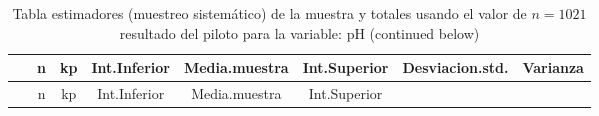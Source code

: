 \documentclass[
]{article}
\begin{document}
\begin{longtable}[]{@{}cccccccc@{}}
\caption{Tabla estimadores (muestreo sistemático) de la muestra y
totales usando el valor de \(n = 1021\) resultado del piloto para la
variable: pH (continued below)}\tabularnewline
\toprule
\begin{minipage}[b]{0.18\columnwidth}\centering
~\strut
\end{minipage} & \begin{minipage}[b]{0.05\columnwidth}\centering
n\strut
\end{minipage} & \begin{minipage}[b]{0.03\columnwidth}\centering
kp\strut
\end{minipage} & \begin{minipage}[b]{0.10\columnwidth}\centering
Int.Inferior\strut
\end{minipage} & \begin{minipage}[b]{0.11\columnwidth}\centering
Media.muestra\strut
\end{minipage} & \begin{minipage}[b]{0.10\columnwidth}\centering
Int.Superior\strut
\end{minipage} & \begin{minipage}[b]{0.12\columnwidth}\centering
Desviacion.std.\strut
\end{minipage} & \begin{minipage}[b]{0.08\columnwidth}\centering
Varianza\strut
\end{minipage}\tabularnewline
\midrule
\endfirsthead
\toprule
\begin{minipage}[b]{0.18\columnwidth}\centering
~\strut
\end{minipage} & \begin{minipage}[b]{0.05\columnwidth}\centering
n\strut
\end{minipage} & \begin{minipage}[b]{0.03\columnwidth}\centering
kp\strut
\end{minipage} & \begin{minipage}[b]{0.10\columnwidth}\centering
Int.Inferior\strut
\end{minipage} & \begin{minipage}[b]{0.11\columnwidth}\centering
Media.muestra\strut
\end{minipage} & \begin{minipage}[b]{0.10\columnwidth}\centering
Int.Superior\strut
\end{minipage} & \begin{minipage}[b]{0.12\columnwidth}\centering

\end{minipage}
\end{longtable}
\end{document}
